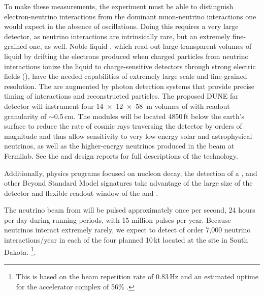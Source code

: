 \documentclass[../main-v1.tex]{subfiles}
\begin{document}
To make these measurements, the experiment must be able to distinguish %
electron-neutrino interactions from the dominant muon-neutrino interactions one would expect in the absence of oscillations.  %
Doing this requires a very large detector, as neutrino interactions are intrinsically rare, but an extremely  fine-grained one, as well.  Noble liquid  , %
which read out large transparent volumes of liquid by drifting the electrons produced when charged particles from neutrino interactions ionize the liquid to charge-sensitive detectors through strong electric fields (), have the needed capabilities of extremely large scale and fine-grained resolution. The  are augmented by photon detection systems that provide precise timing of interactions and reconstructed particles. The proposed DUNE far detector will instrument four \SI{14x12x58}{m} %
volumes of  with readout granularity of $\sim$0.5\,cm.  The  modules will be located 4850\,ft below the earth's surface to reduce the rate of cosmic rays traversing the detector by orders of magnitude and thus allow sensitivity to very low-energy solar and astrophysical neutrinos, as well as the higher-energy neutrinos produced in the beam at Fermilab.  %
See the  and  design reports\cite{tdr-vol-1, tdr-vol-2, DUNE:2021tad} for full descriptions of the  technology. 

Additionally, physics programs focused on nucleon decay, the detection of a , and other Beyond Standard Model  signatures take advantage of the large size of the detector and flexible readout window of the  and . %


The neutrino beam from  will be pulsed approximately once per second, 24 hours per day during running periods, %
with 15 million pulses per year.  Because neutrinos interact  extremely rarely, we expect to detect of order 7,000 neutrino interactions/year in each of the four planned 10\,kt  located at the  site in South Dakota. 
\footnote{This is based on the beam repetition rate of 0.83\,Hz and an estimated uptime for the accelerator complex of 56\% \cite{Abi:2020evt}.}.
\end{document}
